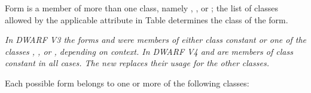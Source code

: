 Form  is a member of more than one class,
namely , ,  or ; the list
of classes allowed by the applicable attribute in 
Table 
determines the class of the form.

\textit{In DWARF V3 the forms  and  were
members of either class constant or one of the classes ,
,  or , depending on context. In
DWARF V4  and  are members of class
constant in all cases. The new  replaces
their usage for the other classes.}

Each possible form belongs to one or more of the following classes:

